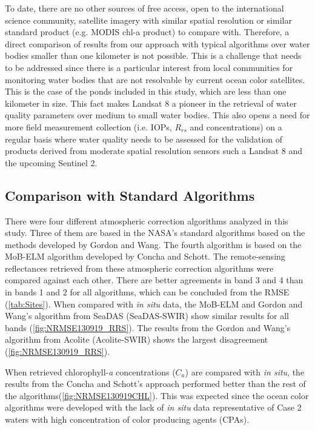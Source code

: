 To date, there are no other sources of free access, open to the international science community, satellite imagery with similar spatial resolution or similar standard product (e.g. MODIS chl-a product) to compare with. Therefore, a direct comparison of results from our approach with typical algorithms over water bodies smaller than one kilometer is not possible. This is a challenge that needs to be addressed since there is a particular interest from local communities for monitoring water bodies that are not resolvable by current ocean color satellites. This is the case of the ponds included in this study, which are less than one kilometer in size. This fact makes Landsat 8 a pioneer in the retrieval of water quality parameters over medium to small water bodies. This also opens a need for more field measurement collection (i.e. IOPs, $R_{rs}$ and concentrations) on a regular basis where water quality needs to be assessed for the validation of products derived from moderate spatial resolution sensors such a Landsat 8 and the upcoming Sentinel 2. 

\subsection{Comparison with Standard Algorithms}
There were four different atmospheric correction algorithms analyzed in this study. Three of them are based in the NASA's standard algorithms based on the methods developed by Gordon and Wang\cite{Gordon:1994}. The fourth algorithm is based on the MoB-ELM algorithm developed by Concha and Schott\cite{Concha2014SPIE}. The remote-sensing reflectances retrieved from these atmospheric correction algorithms were compared against each other. There are better agreements in band 3 and 4 than in bands 1 and 2 for all algorithms, which can be concluded from the RMSE (\autoref{tab:Sites}). When compared with {\it in situ} data, the MoB-ELM and Gordon and Wang's algorithm from SeaDAS (SeaDAS-SWIR) show similar results for all bands (\autoref{fig:NRMSE130919_RRS}). The results from the Gordon and Wang's algorithm from Acolite (Acolite-SWIR) shows the largest disagreement (\autoref{fig:NRMSE130919_RRS}).

When retrieved chlorophyll-{\it a} concentrations ($C_a$) are compared with {\it in situ}, the results from the Concha and Schott's approach performed better than the rest of the algorithms(\autoref{fig:NRMSE130919CHL}). This was expected since the ocean color algorithms were developed with the lack of {\it in situ} data representative of Case 2 waters with high concentration of color producing agents (CPAs).

